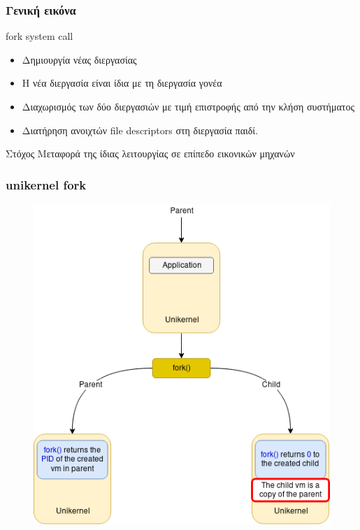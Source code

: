 \documentclass[red,slidestop,notes,compress,mathserif]{beamer}
\begin{document}
\begin{frame}
\frametitle{Γενική εικόνα}
\begin{block}{fork system call}
\begin{itemize}
\item Δημιουργία νέας διεργασίας
\item Η νέα διεργασία είναι ίδια με τη διεργασία γονέα
\item Διαχωρισμός των δύο διεργασιών με τιμή επιστροφής από την κλήση συστήματος
\item Διατήρηση ανοιχτών file descriptors στη διεργασία παιδί.
\end{itemize}
\end{block}
\begin{block}{Στόχος}
Μεταφορά της ίδιας λειτουργίας σε επίπεδο εικονικών μηχανών
\end{block}
\end{frame}

\begin{frame}
\frametitle{unikernel fork}
\begin{figure}
\center
\includegraphics[scale=0.4]{figures/unikernel_fork.png}
\end{figure}
\end{frame}
\end{document}
